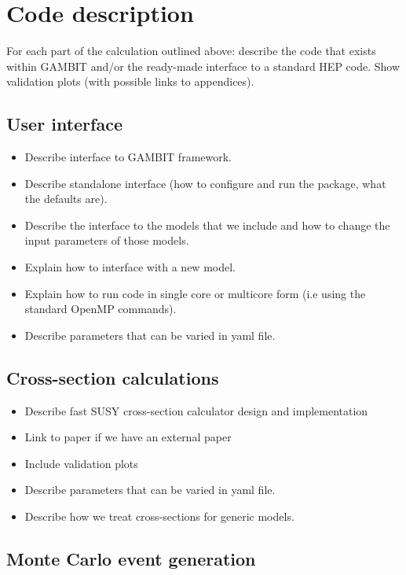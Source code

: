 \documentclass[11pt,a4paper]{article}
\begin{document}
\section{Code description}

For each part of the calculation outlined above: describe the code that exists within GAMBIT and/or the ready-made interface to a standard HEP code. Show validation plots (with possible links to appendices).

\subsection{User interface}

\begin{itemize}
\item Describe interface to GAMBIT framework.
\item Describe standalone interface (how to configure and run the package, what the defaults are).
\item Describe the interface to the models that we include and how to change the input parameters of those models.
\item Explain how to interface with a new model.
\item Explain how to run code in single core or multicore form (i.e using the standard OpenMP commands).
\item Describe parameters that can be varied in yaml file.
\end{itemize}

\subsection{Cross-section calculations}

\begin{itemize}
\item Describe fast SUSY cross-section calculator design and implementation
\item Link to paper if we have an external paper
\item Include validation plots
\item Describe parameters that can be varied in yaml file.
\item Describe how we treat cross-sections for generic models.
\end{itemize}

\subsection{Monte Carlo event generation}
\end{document}
